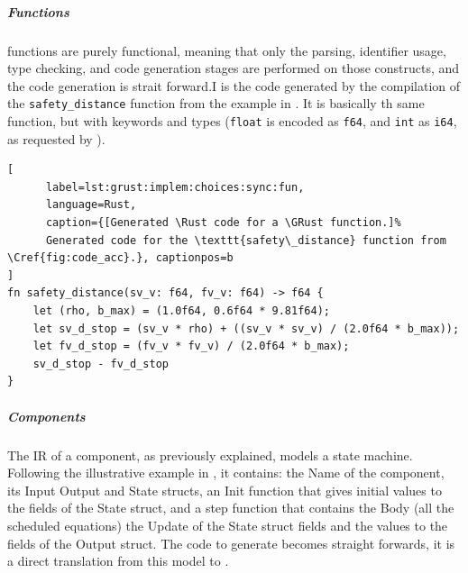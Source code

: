 \subparagraph{Functions}
\GRSync functions are purely functional, meaning that only the parsing, identifier usage, type
checking, and \Rust code generation stages are performed on those constructs, and the \Rust code
generation is strait forward.I
%
 is the code generated by the compilation of the
\texttt{safety\_distance} \GRSync function from the example in .
It is basically th same function, but with \Rust keywords and types (\texttt{float} is encoded as
\texttt{f64}, and \texttt{int} as \texttt{i64}, as requested by \ampere).

\begin{lstlisting}[
      label=lst:grust:implem:choices:sync:fun,
      language=Rust,
      caption={[Generated \Rust code for a \GRust function.]%
      Generated code for the \texttt{safety\_distance} function from \Cref{fig:code_acc}.}, captionpos=b
]
fn safety_distance(sv_v: f64, fv_v: f64) -> f64 {
    let (rho, b_max) = (1.0f64, 0.6f64 * 9.81f64);
    let sv_d_stop = (sv_v * rho) + ((sv_v * sv_v) / (2.0f64 * b_max));
    let fv_d_stop = (fv_v * fv_v) / (2.0f64 * b_max);
    sv_d_stop - fv_d_stop
}
\end{lstlisting}

\subparagraph{Components}
The IR of a component, as previously explained, models a state machine. Following the illustrative
example in , it contains: the Name of the
component, its Input Output and State structs, an Init function that gives initial values to the
fields of the State struct, and a step function that contains the Body (all the scheduled equations)
the Update of the State struct fields and the values to the fields of the Output struct.
The code to generate becomes straight forwards, it is a direct translation from this model to \Rust.

